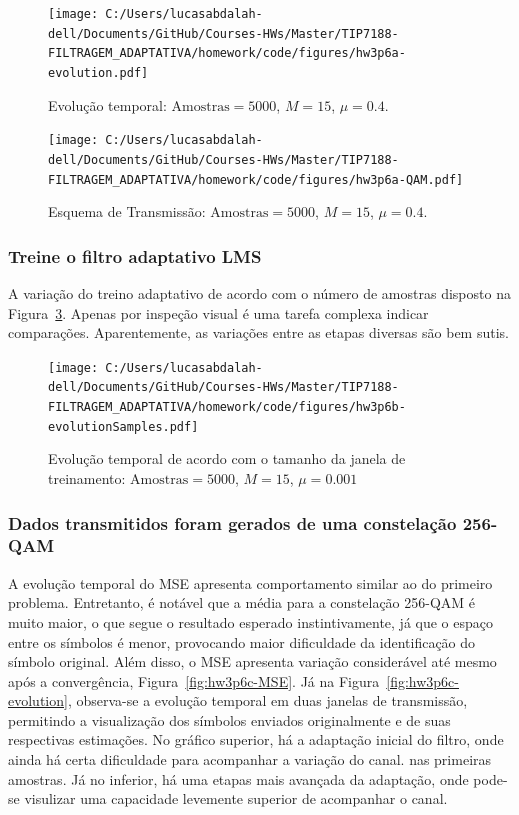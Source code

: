 \begin{figure}[!htp]
    \centering
    \texttt{[image: C:/Users/lucasabdalah-dell/Documents/GitHub/Courses-HWs/Master/TIP7188-FILTRAGEM\_ADAPTATIVA/homework/code/figures/hw3p6a-evolution.pdf]}
    \caption{Evolução temporal: $\text{Amostras} = 5000$, $M = 15$, $\mu = 0.4$.}
    \label{fig:hw3p6a-evolution}
\end{figure}

\clearpage


\begin{figure}[!htp]
    \centering
    \texttt{[image: C:/Users/lucasabdalah-dell/Documents/GitHub/Courses-HWs/Master/TIP7188-FILTRAGEM\_ADAPTATIVA/homework/code/figures/hw3p6a-QAM.pdf]}
    \caption{Esquema de Transmissão: $\text{Amostras} = 5000$, $M = 15$, $\mu = 0.4$.}
    \label{fig:hw3p6a-QAM}
\end{figure}


\subsubsection*{Treine o ﬁltro adaptativo LMS}
A variação do treino adaptativo de acordo com o número de amostras disposto na Figura~\ref{fig:hw3p6b-evolutionSamples}. Apenas por inspeção visual é uma tarefa complexa indicar comparações. Aparentemente, as variações entre as etapas diversas são bem sutis.

\begin{figure}[!htp]
    \centering
    \texttt{[image: C:/Users/lucasabdalah-dell/Documents/GitHub/Courses-HWs/Master/TIP7188-FILTRAGEM\_ADAPTATIVA/homework/code/figures/hw3p6b-evolutionSamples.pdf]}
    \caption{Evolução temporal de acordo com o tamanho da janela de treinamento: $\text{Amostras} = 5000$, $M = 15$, $\mu = 0.001$}
    \label{fig:hw3p6b-evolutionSamples}
\end{figure}

\clearpage

\subsubsection*{Dados transmitidos foram gerados de uma constelação 256-QAM}


A evolução temporal do MSE apresenta comportamento similar ao do primeiro problema. Entretanto, é notável que a média para a constelação 256-QAM é muito maior, o que segue o resultado esperado instintivamente, já que o espaço entre os símbolos é menor, provocando maior dificuldade da identificação do símbolo original. Além disso, o MSE apresenta variação considerável até mesmo após a convergência, Figura~\ref{fig:hw3p6c-MSE}. Já na Figura~\ref{fig:hw3p6c-evolution}, observa-se a evolução temporal em duas janelas de transmissão, permitindo a visualização dos símbolos enviados originalmente e de suas respectivas estimações.  No gráfico superior, há a adaptação inicial do filtro, onde ainda há certa dificuldade para acompanhar a variação do canal. nas primeiras amostras. Já no inferior, há uma etapas mais avançada da adaptação, onde pode-se visulizar uma capacidade levemente superior de acompanhar o canal.

